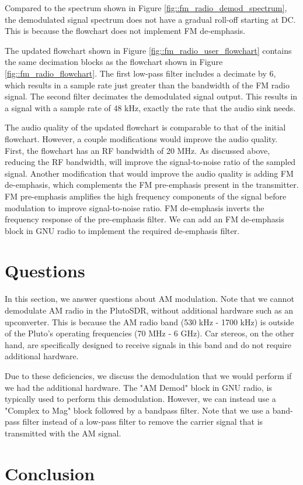 \documentclass{article}
\begin{document}
\noindent Compared to the spectrum shown in Figure \ref{fig::fm_radio_demod_spectrum}, the demodulated signal spectrum does not have a gradual roll-off starting at DC. This is because the flowchart does not implement FM de-emphasis.

The updated flowchart shown in Figure \ref{fig::fm_radio_user_flowchart} contains the same decimation blocks as the flowchart shown in Figure \ref{fig::fm_radio_flowchart}. The first low-pass filter includes a decimate by 6, which results in a sample rate just greater than the bandwidth of the FM radio signal. The second filter decimates the demodulated signal output. This results in a signal with a sample rate of 48 kHz, exactly the rate that the audio sink needs.

The audio quality of the updated flowchart is comparable to that of the initial flowchart. However, a couple modifications would improve the audio quality. First, the flowchart has an RF bandwidth of 20 MHz. As discussed above, reducing the RF bandwidth, will improve the signal-to-noise ratio of the sampled signal. Another modification that would improve the audio quality is adding FM de-emphasis, which complements the FM pre-emphasis present in the transmitter. FM pre-emphasis amplifies the high frequency components of the signal before modulation to improve signal-to-noise ratio. FM de-emphasis inverts the frequency response of the pre-emphasis filter. We can add an FM de-emphasis block in GNU radio to implement the required de-emphasis filter.

\section{Questions}

In this section, we answer questions about AM modulation. Note that we cannot demodulate AM radio in the PlutoSDR, without additional hardware such as an upconverter. This is because the AM radio band (530 kHz - 1700 kHz) is outside of the Pluto's operating frequencies (70 MHz - 6 GHz). Car stereos, on the other hand, are specifically designed to receive signals in this band and do not require additional hardware.

Due to these deficiencies, we discuss the demodulation that we would perform if we had the additional hardware. The "AM Demod" block in GNU radio, is typically used to perform this demodulation. However, we can instead use a "Complex to Mag" block followed by a bandpass filter. Note that we use a band-pass filter instead of a low-pass filter to remove the carrier signal that is transmitted with the AM signal.
  
\section{Conclusion}

%
%
	
\end{document}
